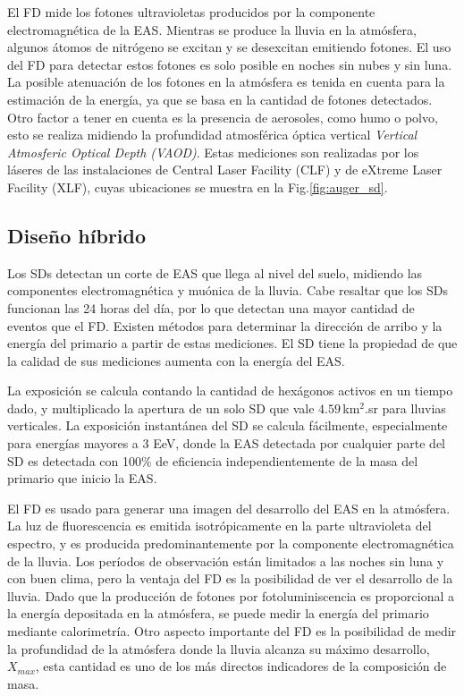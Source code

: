 El FD mide los fotones ultravioletas producidos por la componente electromagnética de la EAS. Mientras se produce la lluvia en la atmósfera, algunos átomos de nitrógeno se excitan y se desexcitan emitiendo fotones. El uso del FD para detectar estos fotones es solo posible en noches sin nubes y sin luna. La posible atenuación de los fotones en la atmósfera es tenida en cuenta para la estimación de la energía, ya que se basa en la cantidad de fotones detectados. Otro factor a tener en cuenta es la presencia de aerosoles, como humo o polvo, esto se realiza midiendo la profundidad atmosférica óptica vertical \emph{Vertical Atmosferic Optical Depth (VAOD)}. Estas mediciones son realizadas por los láseres de las instalaciones de Central Laser Facility (CLF) y de eXtreme Laser Facility (XLF), cuyas ubicaciones se muestra en la Fig.\ref{fig:auger_sd}.

\subsection{Diseño híbrido}\label{seccion:sd_eff}
Los SDs detectan un corte de EAS que llega al nivel del suelo, midiendo las componentes electromagnética y muónica de la lluvia. Cabe resaltar que los SDs funcionan las 24 horas del día, por lo que detectan una mayor cantidad de eventos que el FD. Existen métodos para determinar la dirección de arribo y la energía del primario a partir de estas mediciones.  El SD tiene la propiedad de que la calidad de sus mediciones aumenta con la energía del EAS. 

La exposición se calcula contando la cantidad de hexágonos activos en un tiempo dado, y multiplicado la apertura de un solo SD que vale $4.59\,$km$^2$.sr para lluvias verticales. La exposición instantánea del SD se calcula fácilmente, especialmente para energías mayores a 3 EeV, donde la EAS detectada por cualquier parte del SD es detectada con 100\% de eficiencia independientemente de la masa del primario que inicio la EAS.

El FD es usado para generar una imagen del desarrollo del EAS en la atmósfera. La luz de fluorescencia es emitida isotrópicamente en la parte ultravioleta del espectro, y es producida predominantemente por la componente electromagnética de la lluvia. Los períodos de observación están limitados a las noches sin luna y con buen clima, pero la ventaja del FD es la posibilidad de ver el desarrollo de la lluvia. Dado que la producción de fotones por fotoluminiscencia es proporcional a la energía depositada en la atmósfera, se puede medir la energía del primario mediante calorimetría. Otro aspecto importante del FD es la posibilidad de medir la profundidad de la atmósfera donde la lluvia alcanza su máximo desarrollo, $X_{max}$, esta cantidad es uno de los más directos indicadores de la composición de masa. \cite{data}

